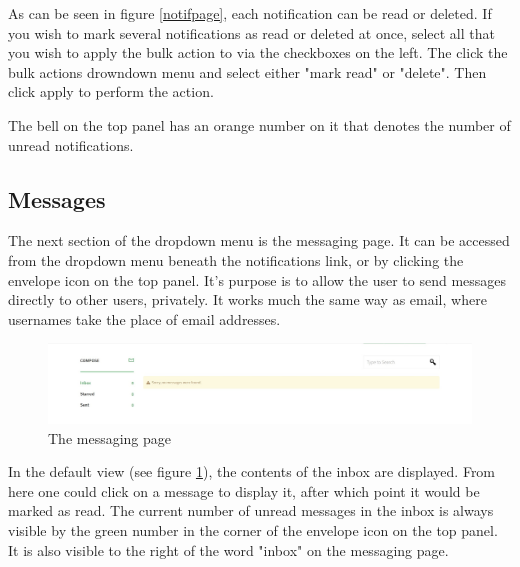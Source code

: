 \documentclass[10pt]{article}
\begin{document}
\begin{flushleft}
As can be seen in figure \ref{notifpage}, each notification can be read or deleted.  If you wish to mark several notifications as read or deleted at once, select all that you wish to apply the bulk action to via the checkboxes on the left.  The click the bulk actions drowndown menu and select either "mark read" or "delete".  Then click apply to perform the action. 
\end{flushleft}

\begin{flushleft}
The bell on the top panel has an orange number on it that denotes the number of unread notifications. 
\end{flushleft}

\subsection{Messages}

\begin{flushleft}

The next section of the dropdown menu is the messaging page.  It can be accessed from the dropdown menu beneath the notifications link, or by clicking the envelope icon on the top panel.  It's purpose is to allow the user to send messages directly to other users, privately.  It works much the same way as email, where usernames take the place of email addresses.


\end{flushleft}

\begin{figure}[H]
    \centering
    \includegraphics[scale=0.5]{images/messaging.jpg}
    \caption{The messaging page}
    \label{messaging}
\end{figure}

\begin{flushleft}

In the default view (see figure \ref{messaging}), the contents of the inbox are displayed.  From here one could click on a message to display it, after which point it would be marked as read.  The current number of unread messages in the inbox is always visible by the green number in the corner of the envelope icon on the top panel.  It is also visible to the right of the word "inbox" on the messaging page. 

\end{flushleft}
\end{document}
